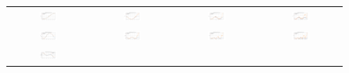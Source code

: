 \begin{figure}[ht]
  \centering
  \begin{tabular}{cccc}
    \includegraphics[width=0.23\textwidth]{images/gnn_obs_naive_j1_jj1_0.png} &
    \includegraphics[width=0.23\textwidth]{images/gnn_obs_naive_j1_jj2_0.png} &
    \includegraphics[width=0.23\textwidth]{images/gnn_obs_naive_j1_jj3_0.png} &
    \includegraphics[width=0.23\textwidth]{images/gnn_obs_naive_j1_jj4_0.png} \\
    \includegraphics[width=0.23\textwidth]{images/gnn_obs_naive_j2_jj1_0.png} &
    \includegraphics[width=0.23\textwidth]{images/gnn_obs_naive_j2_jj2_0.png} &
    \includegraphics[width=0.23\textwidth]{images/gnn_obs_naive_j2_jj3_0.png} &
    \includegraphics[width=0.23\textwidth]{images/gnn_obs_naive_j2_jj4_0.png} \\
    \includegraphics[width=0.23\textwidth]{images/gnn_obs_naive_j3_jj1_0.png} &

\end{tabular}
\end{figure}
